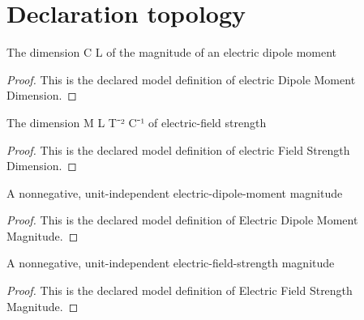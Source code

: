 \section{Declaration topology}
\begin{definition}
  \label{def:physics:phyx-mini-0856:phyxminiproblems-problemphyxmini0856-electricdipolemomentdimension}
  The dimension C L of the magnitude of an electric dipole moment
\end{definition}
\begin{proof}
  This is the declared model definition of electric Dipole Moment Dimension.
\end{proof}
\begin{definition}
  \label{def:physics:phyx-mini-0856:phyxminiproblems-problemphyxmini0856-electricfieldstrengthdimension}
  The dimension M L T⁻² C⁻¹ of electric-field strength
\end{definition}
\begin{proof}
  This is the declared model definition of electric Field Strength Dimension.
\end{proof}
\begin{definition}
  \label{def:physics:phyx-mini-0856:phyxminiproblems-problemphyxmini0856-electricdipolemomentmagnitude}
  A nonnegative, unit-independent electric-dipole-moment magnitude
\end{definition}
\begin{proof}
  This is the declared model definition of Electric Dipole Moment Magnitude.
\end{proof}
\begin{definition}
  \label{def:physics:phyx-mini-0856:phyxminiproblems-problemphyxmini0856-electricfieldstrengthmagnitude}
  A nonnegative, unit-independent electric-field-strength magnitude
\end{definition}
\begin{proof}
  This is the declared model definition of Electric Field Strength Magnitude.
\end{proof}
